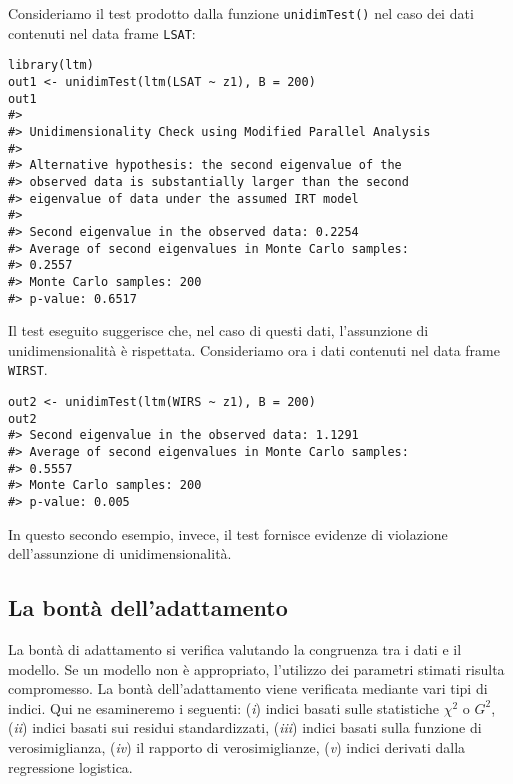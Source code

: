 \begin{exmp}
Consideriamo il test prodotto dalla funzione {\tt unidimTest()} nel caso dei dati contenuti nel data frame {\tt LSAT}:
\begin{lstlisting}
library(ltm)
out1 <- unidimTest(ltm(LSAT ~ z1), B = 200)
out1
#> 
#> Unidimensionality Check using Modified Parallel Analysis
#> 
#> Alternative hypothesis: the second eigenvalue of the  
#> observed data is substantially larger than the second 
#> eigenvalue of data under the assumed IRT model
#> 
#> Second eigenvalue in the observed data: 0.2254
#> Average of second eigenvalues in Monte Carlo samples: 
#> 0.2557
#> Monte Carlo samples: 200
#> p-value: 0.6517
\end{lstlisting}
Il test eseguito suggerisce che, nel caso di questi dati, l'assunzione di unidimensionalità è rispettata. Consideriamo ora i dati contenuti nel data frame {\tt WIRST}.
\begin{lstlisting}
out2 <- unidimTest(ltm(WIRS ~ z1), B = 200)
out2
#> Second eigenvalue in the observed data: 1.1291
#> Average of second eigenvalues in Monte Carlo samples: 
#> 0.5557
#> Monte Carlo samples: 200
#> p-value: 0.005
\end{lstlisting}
In questo secondo esempio, invece, il test fornisce evidenze di violazione dell'assunzione di unidimensionalità.
\end{exmp}


\subsection{La bontà dell'adattamento}

La bontà di adattamento si verifica valutando la congruenza tra i dati
e il modello. Se un modello non è appropriato, l'utilizzo dei parametri
stimati risulta compromesso. La bontà dell'adattamento viene verificata mediante vari tipi di indici.  Qui ne esamineremo i seguenti: (\emph{i}) indici basati sulle statistiche 
$\chi^2$ o $G^2$, (\emph{ii}) indici basati sui residui standardizzati,
(\emph{iii}) indici basati sulla funzione di verosimiglianza,
(\emph{iv}) il rapporto di verosimiglianze, (\emph{v}) indici derivati
dalla regressione logistica.


